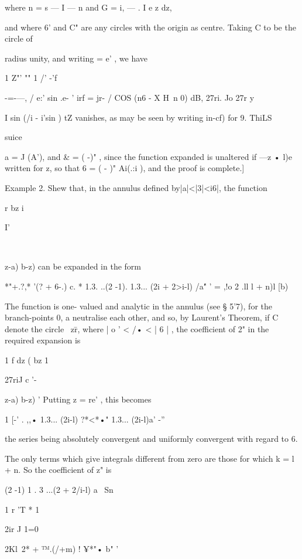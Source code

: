 {{where n = s — I — n and G = i, — . I e z dz,

and where 6' and C" are any circles with the origin as centre. Taking
C to be the circle of

radius unity, and writing = e' , we have

1 Z"' "" 1 /' -'f

 -=-—, / e:' sin .e- ' irf = jr- / COS (n6 - X H\ n 0) dB, 27ri. Jo
27r y

I sin (/i - i'sin ) tZ vanishes, as may be seen by writing in-cf) for
9. ThiLS



suice



a = J (A'), and \& = ( -)" , since the function expanded is unaltered
if —z • l)e written for z, so that 6 = ( - )" Ai(.:i ), and the proof
is complete.]

Example 2. Shew that, in the annulus defined by|a|<|3|<i6|, the
function

r bz i



I'



\ \ {z-a) b-z) can be expanded in the form

*"+.?,* '(? + 6-.) c. * 1.3. ..(2 -1). 1.3... (2i + 2>i-l) /a\' " ' =
,!o 2 .ll l + n)l [b)

The function is one- valued and analytic in the annulus (see § 5'7),
for the branch-points 0, a neutralise each other, and so, by Laurent's
Theorem, if C denote the circle \ z\=r, where | o ' < /• < | 6 | , the
coefficient of 2" in the required expansion is

1 f dz ( bz 1

27riJ c '- \ \ {z-a) b-z) ' Putting z = re' , this becomes

1 [-' . ,,• 1.3... (2i-l) ?*<*•" 1.3... (2i-l)a' -''

the series being absolutely convergent and uniformly convergent with
regard to 6.

The only terms which give integrals different from zero are those for
which k = l + n. So the coefficient of z" is

(2 -1) 1 . 3 ...(2 + 2/i-l) a \ Sn



1 r 'T * 1

2ir J 1=0



2Kl\ 2* + ™.(/+m) ! ¥*"• b" '



}}}}
